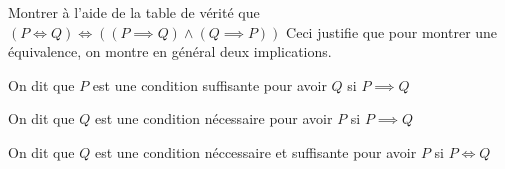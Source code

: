 \begin{exo}
    Montrer à l'aide de la table de vérité que $(P\iff Q)\iff((P\implies Q)\land(Q\implies P))$
    Ceci justifie que pour montrer une équivalence, on montre en général deux implications.
\end{exo}
\begin{defini}
    On dit que $P$ est une condition suffisante pour avoir $Q$ si $P\implies Q$

    On dit que $Q$ est une condition nécessaire pour avoir $P$ si $P\implies Q$

    On dit que $Q$ est une condition néccessaire et suffisante pour avoir $P$ si $P\iff Q$
\end{defini}